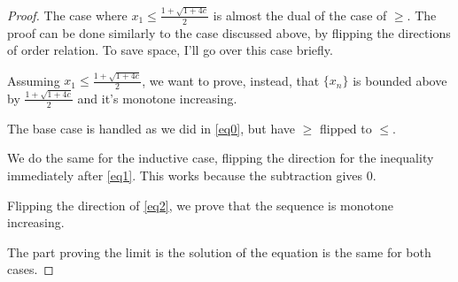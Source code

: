 \documentclass{article}
\begin{document}
\begin{enumerate}
\begin{proof}
    
    

    The case where $x_1 \leq \frac{1+\sqrt{1+4c}}{2}$ is almost the dual of
    the case of $\geq$. The proof can be done similarly to the case
    discussed above, by flipping the directions of order relation. To save
    space, I'll go over this case briefly.

    Assuming $x_1 \leq \frac{1+\sqrt{1+4c}}{2}$, we want to prove,
    instead, that $\{x_n\}$ is bounded above by
    $\frac{1+\sqrt{1+4c}}{2}$ and it's monotone increasing.

    The base case is handled as we did in \ref{eq0}, but have $\geq$
    flipped to $\leq$.

    We do the same for the inductive case, flipping the direction for
    the inequality immediately after \ref{eq1}. This works because the
    subtraction gives $0$.

    Flipping the direction of \ref{eq2}, we prove that the sequence is
    monotone increasing.

    The part proving the limit is the solution of the equation is the
    same for both cases.
    
  \end{proof}
\end{enumerate}
\end{document}
